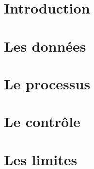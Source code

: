 \documentclass[12pt,a4paper]{article}
\begin{document}


\tableofcontents

\clearpage


\section{Introduction}


\section{Les données}


\section{Le processus}


\section{Le contrôle}


\section{Les limites}


\newpage

\printbibliography
\end{document}
